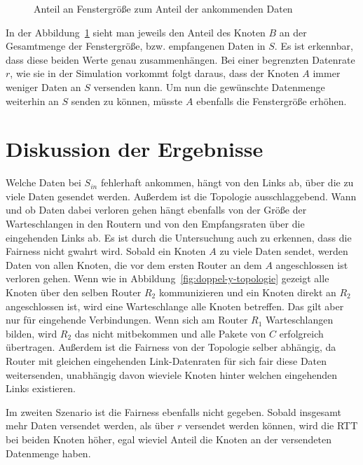 \documentclass [10pt,a4paper]{article}
\begin{document}
		\begin{figure}[[h!]
			\caption[Anteil an Fenstergröße zum Anteil der ankommenden Daten]{Anteil an Fenstergröße zum Anteil der ankommenden Daten}
			\label{fig:winsize-a-b-different}
		\end{figure}
		
		In der Abbildung~\ref{fig:winsize-a-b-different} sieht man jeweils den Anteil des Knoten $B$ an der Gesamtmenge der Fenstergröße, bzw. empfangenen Daten in $S$. Es ist erkennbar, dass diese beiden Werte genau zusammenhängen. Bei einer begrenzten Datenrate $r$, wie sie in der Simulation vorkommt folgt daraus, dass der Knoten $A$ immer weniger Daten an $S$ versenden kann. Um nun die gewünschte Datenmenge weiterhin an $S$ senden zu können, müsste $A$ ebenfalls die Fenstergröße erhöhen.
		

\section{Diskussion der Ergebnisse}
	Welche Daten bei $S_{in}$ fehlerhaft ankommen, hängt von den Links ab, über die zu viele Daten gesendet werden. Außerdem ist die Topologie ausschlaggebend. Wann und ob Daten dabei verloren gehen hängt ebenfalls von der Größe der Warteschlangen in den Routern und von den Empfangsraten über die eingehenden Links ab. Es ist durch die Untersuchung auch zu erkennen, dass die Fairness nicht gwahrt wird. Sobald ein Knoten $A$ zu viele Daten sendet, werden Daten von allen Knoten, die vor dem ersten Router an dem $A$ angeschlossen ist verloren gehen. Wenn wie in Abbildung~\ref{fig:doppel-y-topologie} gezeigt alle Knoten über den selben Router $R_2$ kommunizieren und ein Knoten direkt an $R_2$ angeschlossen ist, wird eine Warteschlange alle Knoten betreffen. Das gilt aber nur für eingehende Verbindungen. Wenn sich am Router $R_1$ Warteschlangen bilden, wird $R_2$ das nicht mitbekommen und alle Pakete von $C$ erfolgreich übertragen. Außerdem ist die Fairness von der Topologie selber abhängig, da Router mit gleichen eingehenden Link-Datenraten für sich fair diese Daten weitersenden, unabhängig davon wieviele Knoten hinter welchen eingehenden Links existieren.
	
	Im zweiten Szenario ist die Fairness ebenfalls nicht gegeben. Sobald insgesamt mehr Daten versendet werden, als über $r$ versendet werden können, wird die RTT bei beiden Knoten höher, egal wieviel Anteil die Knoten an der versendeten Datenmenge haben.


	
\end{document}
